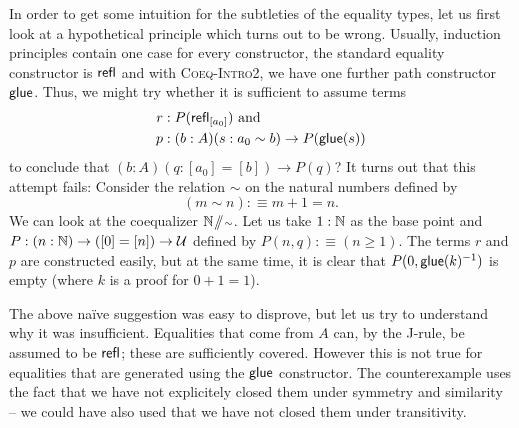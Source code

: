 In order to get some intuition for the subtleties of the equality types,
let us first look at a hypothetical principle which turns out to be wrong.
Usually, induction principles contain one case for every constructor,
the standard equality constructor is $\mathsf{refl}$ and with \textsc{Coeq-Intro2}, we
have one further path constructor $\mathsf{glue}$.
Thus, we might try whether it is sufficient to assume terms
\begin{align*}
r &: P(\mathsf{refl}_{[a_0]}) \text{ and}\\
p &: (b : A)(s : a_0 \sim b) \to P(\mathsf{glue}(s))
\end{align*}
to conclude that $(b : A)(q : [a_0] = [b]) \to P(q)$?
It turns out that this attempt fails:
Consider the relation $\sim$ on the natural numbers defined by
\begin{equation*}
(m \sim n) :\equiv m + 1 = n \text{.}
\end{equation*}
We can look at the coequalizer $\mathbb{N} \! \sslash \! {\scriptstyle \sim}$.
Let us take $1 : \mathbb{N}$ as the base point and $P : (n : \mathbb{N}) \to ([0] = [n]) \to \mathcal{U}$
defined by $P(n,q) :\equiv (n \geq 1)$.
The terms $r$ and $p$ are constructed easily, but at the same time, it is clear
that $P(0, \mathsf{glue}(k)^{-1})$ is empty (where $k$ is a proof for $0 + 1 = 1$).

The above naïve suggestion was easy to disprove, but let us try to understand
why it was insufficient.
Equalities that come from $A$ can, by the J-rule, be assumed to be $\mathsf{refl}$;
these are sufficiently covered.
However this is not true for equalities that are generated using the $\mathsf{glue}$ constructor.
The counterexample uses the fact that we have not explicitely closed them under symmetry
and similarity -- we could have also used that we have not closed them
under transitivity.

